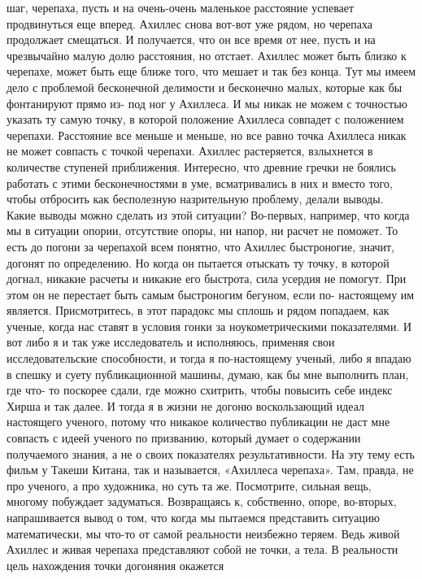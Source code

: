 шаг, черепаха, пусть и на очень-очень маленькое расстояние успевает продвинуться
еще вперед. Ахиллес снова вот-вот уже рядом, но черепаха продолжает смещаться. И
получается, что он все время от нее, пусть и на чрезвычайно малую долю
расстояния, но отстает. Ахиллес может быть близко к черепахе, может быть еще
ближе того, что мешает и так без конца. Тут мы имеем дело с проблемой
бесконечной делимости и бесконечно малых, которые как бы фонтанируют прямо из-
под ног у Ахиллеса. И мы никак не можем с точностью указать ту самую точку, в
которой положение Ахиллеса совпадет с положением черепахи. Расстояние все меньше
и меньше, но все равно точка Ахиллеса никак не может совпасть с точкой черепахи.
Ахиллес растеряется, взлыхнется в количестве ступеней приближения. Интересно,
что древние гречки не боялись работать с этими бесконечностями в уме,
всматривались в них и вместо того, чтобы отбросить как бесполезную назрительную
проблему, делали выводы. Какие выводы можно сделать из этой ситуации? Во-первых,
например, что когда мы в ситуации опории, отсутствие опоры, ни напор, ни расчет
не поможет. То есть до погони за черепахой всем понятно, что Ахиллес
быстроногие, значит, догонят по определению. Но когда он пытается отыскать ту
точку, в которой догнал, никакие расчеты и никакие его быстрота, сила усердия не
помогут. При этом он не перестает быть самым быстроногим бегуном, если по-
настоящему им является. Присмотритесь, в этот парадокс мы сплошь и рядом
попадаем, как ученые, когда нас ставят в условия гонки за ноукометрическими
показателями. И вот либо я и так уже исследователь и исполняюсь, применяя свои
исследовательские способности, и тогда я по-настоящему ученый, либо я впадаю в
спешку и суету публикационной машины, думаю, как бы мне выполнить план, где что-
то поскорее сдали, где можно схитрить, чтобы повысить себе индекс Хирша и так
далее. И тогда я в жизни не догоню воскользающий идеал настоящего ученого,
потому что никакое количество публикации не даст мне совпасть с идеей ученого по
призванию, который думает о содержании получаемого знания, а не о своих
показателях результативности. На эту тему есть фильм у Такеши Китана, так и
называется, «Ахиллеса черепаха». Там, правда, не про ученого, а про художника,
но суть та же. Посмотрите, сильная вещь, многому побуждает задуматься.
Возвращаясь к, собственно, опоре, во-вторых, напрашивается вывод о том, что
когда мы пытаемся представить ситуацию математически, мы что-то от самой
реальности неизбежно теряем. Ведь живой Ахиллес и живая черепаха представляют
собой не точки, а тела. В реальности цель нахождения точки догоняния окажется
